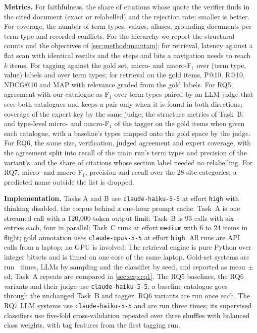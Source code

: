 \textbf{Metrics.} For faithfulness, the share of citations whose quote the
verifier finds in the cited document (exact or relabelled) and the rejection
rate; smaller is better. For coverage, the number of term types, values, aliases, grounding documents
per term type and recorded conflicts. For the hierarchy we report the structural counts and the objectives of
\cref{sec:method:maintain}; for retrieval, latency against a flat scan with
identical results and the steps and bits a navigation needs to reach $k$
items. For tagging against the gold set, micro- and macro-F$_1$ over
(term type, value) labels and over term types; for retrieval on the gold
items, P@10, R@10, NDCG@10 and MAP with relevance graded from the gold
labels. For RQ5, agreement with our catalogue as F$_1$ over term types
paired by an LLM judge that sees both catalogues and keeps a pair only when
it is found in both directions; coverage of the expert key by the same judge;
the structure metrics of Task~B; and type-level micro- and macro-F$_1$ of the
tagger on the gold items when given each catalogue, with a baseline's types
mapped onto the gold space by the judge. For RQ6, the same size, verification,
judged agreement and expert coverage, with the agreement split into recall of
the main run's term types and precision of the variant's, and the share of citations whose section label needed no relabelling. For
RQ7, micro- and macro-F$_1$, precision and recall over the 28 site
categories; a predicted name outside the list is dropped.

\textbf{Implementation.} Tasks A and B use \texttt{claude-haiku-5-5} at
effort \texttt{high} with thinking disabled, the corpus behind a one-hour
prompt cache.
Task~A is one streamed call with a 120,000-token output limit; Task~B is 93
calls with six entries each, four in parallel; Task~C runs at effort \texttt{medium}
with 6 to 24 items in flight; gold annotation uses \texttt{claude-opus-5-5}
at effort \texttt{high}. All runs are API calls from a laptop; no GPU is
involved. The retrieval engine is pure Python over integer bitsets and is
timed on one core of the same laptop. Gold-set systems
are run \EvalRunsWord\ times, LLMs by sampling and the classifier by seed,
and reported as mean $\pm$ sd; Task~A repeats are compared in \cref{sec:exp:rq1}.
The RQ5 baselines, the RQ6 variants and their judge use
\texttt{claude-haiku-5-5}; a baseline catalogue goes through the unchanged
Task~B and tagger. RQ6 variants are run once each. The RQ7 LLM systems use
\texttt{claude-haiku-5-5} and are run three times; its supervised
classifiers use five-fold cross-validation repeated over three shuffles with
balanced class weights, with tag features from the first tagging run.

